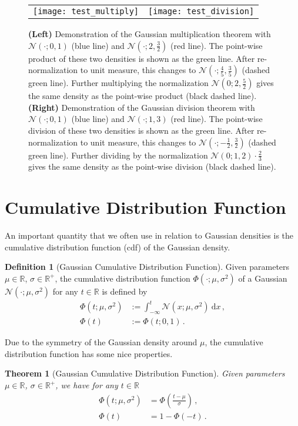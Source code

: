 \documentclass[a4paper]{article}
\newcommand{\Real}{{\mathbb R}}
\newcommand{\Normal}[3]{{\mathcal N} \left({#1};{#2},{#3}\right)}
\newcommand{\NormalCDF}[3]{\Phi \left({#1};{#2},{#3}\right)}
\newcommand{\NormalStandardCDF}[1]{\Phi \left({#1}\right)}
\newcommand{\intd}[1]{\ \mathrm{d}{#1}}
\newtheorem{theorem}{Theorem}
\theoremstyle{definition}
\newtheorem{definition}{Definition}
\begin{document}
\begin{figure}
    \begin{tabular}{cc}
        \texttt{[image: test\_multiply]} & 
        \texttt{[image: test\_division]} \\
    \end{tabular}
    \caption{\label{fig:gaussian_multiplication_division} {\bf (Left)} Demonstration of the Gaussian multiplication theorem with $\Normal{\cdot}{0}{1}$ (blue line) and $\Normal{\cdot}{2}{\frac{3}{2}}$ (red line). The point-wise product of these two densities is shown as the green line. After re-normalization to unit measure, this changes to $\Normal{\cdot}{\frac{4}{5}}{\frac{3}{5}}$ (dashed green line). Further multiplying the normalization $\Normal{0}{2}{\frac{5}{2}}$ gives the same density as the point-wise product (black dashed line). {\bf (Right)} Demonstration of the Gaussian division theorem with $\Normal{\cdot}{0}{1}$ (blue line) and $\Normal{\cdot}{1}{3}$ (red line). The point-wise division of these two densities is shown as the green line. After re-normalization to unit measure, this changes to $\Normal{\cdot}{-\frac{1}{2}}{\frac{3}{2}}$ (dashed green line). Further dividing by the normalization $\Normal{0}{1}{2}\cdot \frac{2}{3}$ gives the same density as the point-wise division (black dashed line).}
\end{figure}

\section*{Cumulative Distribution Function}
An important quantity that we often use in relation to Gaussian densities is the cumulative distribution function (cdf) of the Gaussian density.
\begin{definition}[Gaussian Cumulative Distribution Function] \label{def:gaussian_cdf}
    Given parameters $\mu \in \Real$, $\sigma \in \Real^+$, the cumulative distribution function $\NormalCDF{\cdot}{\mu}{\sigma^2}$ of a Gaussian $\Normal{\cdot}{\mu}{\sigma^2}$ for any $t\in \Real$ is defined by
    \begin{align}
        \NormalCDF{t}{\mu}{\sigma^2} & := \int_{-\infty}^t \Normal{x}{\mu}{\sigma^2}\intd{x} \,, \\
        \NormalStandardCDF{t}        & := \NormalCDF{t}{0}{1} \,.
    \end{align}
\end{definition}

Due to the symmetry of the Gaussian density around $\mu$, the cumulative distribution function has some nice properties.
\begin{theorem}[Gaussian Cumulative Distribution Function] \label{thm:properties_of_Gaussian_CDF}
    Given parameters $\mu \in \Real$, $\sigma \in \Real^+$, we have for any $t\in \Real$
    \begin{align}
        \NormalCDF{t}{\mu}{\sigma^2} & = \NormalStandardCDF{\frac{t-\mu}{\sigma}} \,, \\
        \NormalStandardCDF{t}        & = 1-\NormalStandardCDF{-t} \,.
    \end{align}
\end{theorem}
\end{document}
